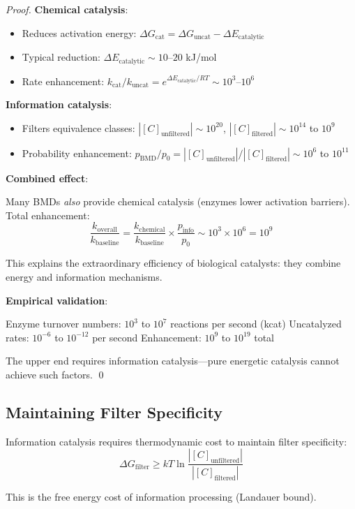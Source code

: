 \begin{proof}
\textbf{Chemical catalysis}:
\begin{itemize}
\item Reduces activation energy: $\Delta G_{\text{cat}} = \Delta G_{\text{uncat}} - \Delta E_{\text{catalytic}}$
\item Typical reduction: $\Delta E_{\text{catalytic}} \sim 10$--$20$ kJ/mol
\item Rate enhancement: $k_{\text{cat}}/k_{\text{uncat}} = e^{\Delta E_{\text{catalytic}}/RT} \sim 10^3$--$10^6$
\end{itemize}

\textbf{Information catalysis}:
\begin{itemize}
\item Filters equivalence classes: $|[C]_{\text{unfiltered}}| \sim 10^{20}$, $|[C]_{\text{filtered}}| \sim 10^{14}$ to $10^9$
\item Probability enhancement: $p_{\text{BMD}}/p_0 = |[C]_{\text{unfiltered}}|/|[C]_{\text{filtered}}| \sim 10^6$ to $10^{11}$
\end{itemize}

\textbf{Combined effect}:

Many BMDs \textit{also} provide chemical catalysis (enzymes lower activation barriers). Total enhancement:
\begin{equation}
\frac{k_{\text{overall}}}{k_{\text{baseline}}} = \frac{k_{\text{chemical}}}{k_{\text{baseline}}} \times \frac{p_{\text{info}}}{p_0} \sim 10^3 \times 10^6 = 10^9
\end{equation}

This explains the extraordinary efficiency of biological catalysts: they combine energy and information mechanisms.

\textbf{Empirical validation}:

Enzyme turnover numbers: $10^3$ to $10^7$ reactions per second (kcat)
Uncatalyzed rates: $10^{-6}$ to $10^{-12}$ per second
Enhancement: $10^9$ to $10^{19}$ total

The upper end requires information catalysis—pure energetic catalysis cannot achieve such factors. \qed
\end{proof}

\subsection{Maintaining Filter Specificity}

\begin{proposition}
\label{prop:bmd_thermodynamic_cost}
Information catalysis requires thermodynamic cost to maintain filter specificity:
\begin{equation}
\Delta G_{\text{filter}} \geq kT \ln \frac{|[C]_{\text{unfiltered}}|}{|[C]_{\text{filtered}}|}
\end{equation}

This is the free energy cost of information processing (Landauer bound).
\end{proposition}

